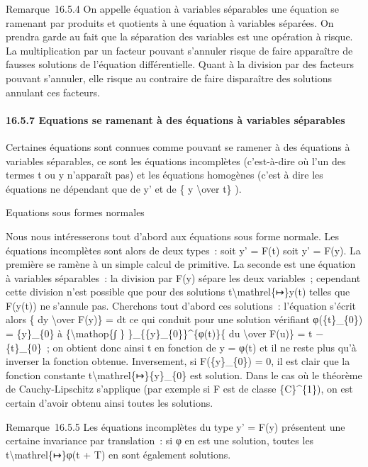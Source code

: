 \documentclass[]{article}
\begin{document}
Remarque~16.5.4 On appelle équation à variables séparables une équation
se ramenant par produits et quotients à une équation à variables
séparées. On prendra garde au fait que la séparation des variables est
une opération à risque. La multiplication par un facteur pouvant
s'annuler risque de faire apparaître de fausses solutions de l'équation
différentielle. Quant à la division par des facteurs pouvant s'annuler,
elle risque au contraire de faire disparaître des solutions annulant ces
facteurs.

\paragraph{16.5.7 Equations se ramenant à des équations à variables
séparables}

Certaines équations sont connues comme pouvant se ramener à des
équations à variables séparables, ce sont les équations incomplètes
(c'est-à-dire où l'un des termes t ou y n'apparaît pas) et les équations
homogènes (c'est à dire les équations ne dépendant que de y' et de \{ y
\textbackslash{}over t\} ).

Equations sous formes normales

Nous nous intéresserons tout d'abord aux équations sous forme normale.
Les équations incomplètes sont alors de deux types~: soit y' = F(t) soit
y' = F(y). La première se ramène à un simple calcul de primitive. La
seconde est une équation à variables séparables~: la division par F(y)
sépare les deux variables~; cependant cette division n'est possible que
pour des solutions t\textbackslash{}mathrel\{↦\}y(t) telles que F(y(t))
ne s'annule pas. Cherchons tout d'abord ces solutions~: l'équation
s'écrit alors \{ dy \textbackslash{}over F(y)\} = dt ce qui conduit pour
une solution vérifiant φ(\{t\}\_\{0\}) = \{y\}\_\{0\} à
\{\textbackslash{}mathop\{∫ \} \}\_\{\{y\}\_\{0\}\}\^{}\{φ(t)\}\{ du
\textbackslash{}over F(u)\} = t − \{t\}\_\{0\}~; on obtient donc ainsi t
en fonction de y = φ(t) et il ne reste plus qu'à inverser la fonction
obtenue. Inversement, si F(\{y\}\_\{0\}) = 0, il est clair que la
fonction constante t\textbackslash{}mathrel\{↦\}\{y\}\_\{0\} est
solution. Dans le cas où le théorème de Cauchy-Lipschitz s'applique (par
exemple si F est de classe \{C\}\^{}\{1\}), on est certain d'avoir
obtenu ainsi toutes les solutions.

Remarque~16.5.5 Les équations incomplètes du type y' = F(y) présentent
une certaine invariance par translation~: si φ en est une solution,
toutes les t\textbackslash{}mathrel\{↦\}φ(t + T) en sont également
solutions.
\end{document}
